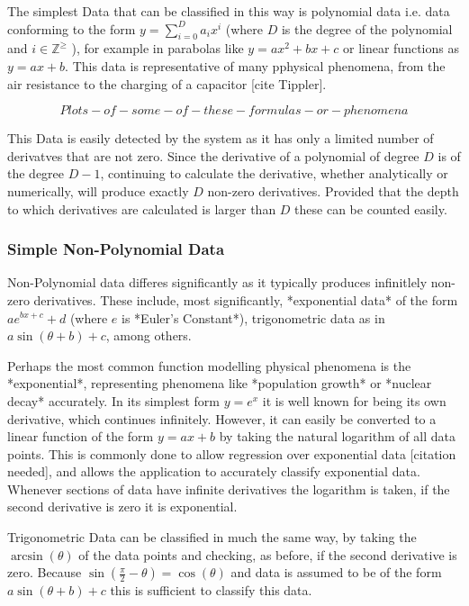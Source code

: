 \documentclass[main.tex]{subfiles}
\begin{document}
  The simplest Data that can be classified in this way is polynomial data i.e. data conforming to the form $y= \sum_{i=0}^{D} a_i x^i$ (where $D$ is the degree of the polynomial and \( i \in \mathbb{Z}^\geq \) ), for example in parabolas like $y=a x^2 + b x +c$ or linear functions as $y=a x + b$. This data is representative of many pphysical phenomena, from the air resistance to the charging of a capacitor [cite Tippler].
  
  \[Plots-of-some-of-these-formulas-or-phenomena\]
  
  This Data is easily detected by  the system as it has only a limited number of derivatves that are not zero. Since the derivative of a polynomial of degree $D$ is of the degree $D-1$, continuing to calculate the derivative, whether analytically or numerically, will produce exactly $D$ non-zero derivatives. Provided that the depth to which derivatives are calculated is larger than $D$ these can be counted easily.
  
  \subsubsection{Simple Non-Polynomial Data}
  
  Non-Polynomial data differes significantly as it typically produces infinitlely non-zero derivatives. These include, most significantly, *exponential data* of the form $a e^{b x + c} + d$ (where $e$ is *Euler's Constant*), trigonometric data as in $a \sin(\theta +b) + c$, among others. 
  
  Perhaps the most common function modelling physical phenomena is the *exponential*, representing phenomena like *population growth* or *nuclear decay* accurately.  In its simplest form $y=e^x$ it is well known for being its own derivative, which continues infinitely. However, it can easily be converted to a linear function of the form $y=a x+b$ by taking the natural logarithm of all data points. This is commonly done to allow regression over exponential data [citation needed], and allows the application to accurately classify exponential data. Whenever sections of data have infinite derivatives the logarithm is taken, if the second derivative is zero it is exponential.
  
  Trigonometric Data  can be classified in much the same way, by taking the $\arcsin(\theta)$ of the data points and checking, as before, if the second derivative is zero. Because $\sin(\frac{\pi}{2}-\theta)=\cos(\theta)$ and data is assumed to be of the form $a \sin( \theta + b)+c$ this is sufficient to classify this data.
  
\end{document}
